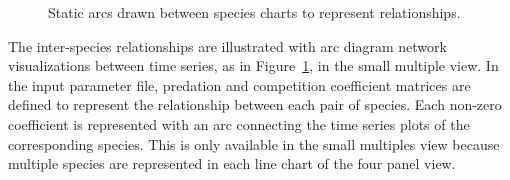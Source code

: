 \begin{figure}
\centering




	\caption[Static arcs drawn between species charts to represent relationships]{Static arcs drawn between species charts to represent relationships.}
	\label{fig:betweenSpeciesArcs}
\end{figure}

The inter-species relationships are illustrated with arc diagram network visualizations between time series, as in Figure~\ref{fig:betweenSpeciesArcs}, in the small multiple view.  In the input parameter file, predation and competition coefficient matrices are defined to represent the relationship between each pair of species.  Each non-zero coefficient is represented with an arc connecting the time series plots of the corresponding species.  This is only available in the small multiples view because multiple species are represented in each line chart of the four panel view.

